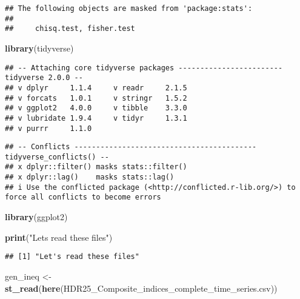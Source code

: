 \documentclass[
]{article}
\newenvironment{Shaded}{\begin{snugshade}}{\end{snugshade}}
\newcommand{\FunctionTok}[1]{\textcolor[rgb]{0.13,0.29,0.53}{\textbf{#1}}}
\newcommand{\NormalTok}[1]{#1}
\newcommand{\OtherTok}[1]{\textcolor[rgb]{0.56,0.35,0.01}{#1}}
\newcommand{\StringTok}[1]{\textcolor[rgb]{0.31,0.60,0.02}{#1}}
\begin{document}
\begin{verbatim}
## The following objects are masked from 'package:stats':
## 
##     chisq.test, fisher.test
\end{verbatim}

\begin{Shaded}
\begin{Highlighting}[]
\FunctionTok{library}\NormalTok{(tidyverse)}
\end{Highlighting}
\end{Shaded}

\begin{verbatim}
## -- Attaching core tidyverse packages ------------------------ tidyverse 2.0.0 --
## v dplyr     1.1.4     v readr     2.1.5
## v forcats   1.0.1     v stringr   1.5.2
## v ggplot2   4.0.0     v tibble    3.3.0
## v lubridate 1.9.4     v tidyr     1.3.1
## v purrr     1.1.0
\end{verbatim}

\begin{verbatim}
## -- Conflicts ------------------------------------------ tidyverse_conflicts() --
## x dplyr::filter() masks stats::filter()
## x dplyr::lag()    masks stats::lag()
## i Use the conflicted package (<http://conflicted.r-lib.org/>) to force all conflicts to become errors
\end{verbatim}

\begin{Shaded}
\begin{Highlighting}[]
\FunctionTok{library}\NormalTok{(ggplot2)}
\end{Highlighting}
\end{Shaded}

\begin{Shaded}
\begin{Highlighting}[]
\FunctionTok{print}\NormalTok{(}\StringTok{"Let\textquotesingle{}s read these files"}\NormalTok{)}
\end{Highlighting}
\end{Shaded}

\begin{verbatim}
## [1] "Let's read these files"
\end{verbatim}

\begin{Shaded}
\begin{Highlighting}[]
\NormalTok{gen\_ineq }\OtherTok{\textless{}{-}} \FunctionTok{st\_read}\NormalTok{(}\FunctionTok{here}\NormalTok{(}\StringTok{\textquotesingle{}HDR25\_Composite\_indices\_complete\_time\_series.csv\textquotesingle{}}\NormalTok{))}
\end{Highlighting}
\end{Shaded}
\end{document}
